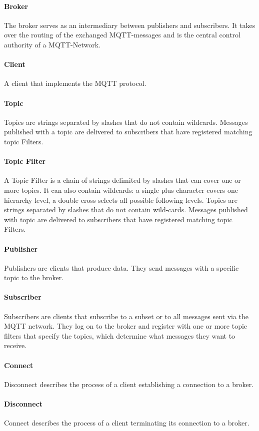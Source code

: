 \paragraph{Broker}
The broker serves as an intermediary between publishers and subscribers.
It takes over the routing of the exchanged MQTT-messages and is the central control authority of a MQTT-Network.
\paragraph{Client}
A client that implements the MQTT protocol. 
\paragraph{Topic}
Topics are strings separated by slashes that do not contain wildcards.
Messages published with a topic are delivered to subscribers that have registered matching topic Filters.
\paragraph{Topic Filter}
A Topic Filter is a chain of strings delimited by slashes that 
can cover one or more topics. 
It can also contain wildcards: a single plus character covers one hierarchy level, a double cross selects all possible following levels.
Topics are strings separated by slashes that do not contain wild-cards.
Messages published with topic are delivered to subscribers that have registered matching topic Filters.
\paragraph{Publisher}
Publishers are clients that produce data.
They send messages with a specific topic to the broker.
\paragraph{Subscriber}
Subscribers are clients that subscribe to a subset or to all messages sent via the
MQTT network.
They log on to the broker and register with one or more topic filters that specify the topics, which determine what messages they want to receive.
\paragraph{Connect}
Disconnect describes the process of a client establishing a connection to a broker.
\paragraph{Disconnect}
Connect describes the process of a client terminating its connection to a broker.


